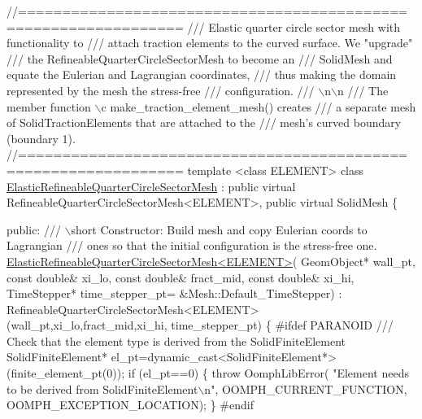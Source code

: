 \begin{DoxyCodeInclude}
\textcolor{comment}{//================================================================}\textcolor{comment}{}
\textcolor{comment}{/// Elastic quarter circle sector mesh with functionality to}
\textcolor{comment}{/// attach traction elements to the curved surface. We "upgrade"}
\textcolor{comment}{/// the RefineableQuarterCircleSectorMesh to become an}
\textcolor{comment}{/// SolidMesh and equate the Eulerian and Lagrangian coordinates,}
\textcolor{comment}{/// thus making the domain represented by the mesh the stress-free }
\textcolor{comment}{/// configuration. }
\textcolor{comment}{/// \(\backslash\)n\(\backslash\)n}
\textcolor{comment}{/// The member function \(\backslash\)c make\_traction\_element\_mesh() creates}
\textcolor{comment}{/// a separate mesh of SolidTractionElements that are attached to the}
\textcolor{comment}{/// mesh's curved boundary (boundary 1). }
\textcolor{comment}{}\textcolor{comment}{//================================================================}
\textcolor{keyword}{template} <\textcolor{keyword}{class} ELEMENT>
\textcolor{keyword}{class }\hyperlink{classElasticRefineableQuarterCircleSectorMesh}{ElasticRefineableQuarterCircleSectorMesh} :
 \textcolor{keyword}{public} \textcolor{keyword}{virtual} RefineableQuarterCircleSectorMesh<ELEMENT>,
 \textcolor{keyword}{public} \textcolor{keyword}{virtual} SolidMesh
\{


\textcolor{keyword}{public}:
\textcolor{comment}{}
\textcolor{comment}{ /// \(\backslash\)short Constructor: Build mesh and copy Eulerian coords to Lagrangian}
\textcolor{comment}{ /// ones so that the initial configuration is the stress-free one.}
\textcolor{comment}{} \hyperlink{classElasticRefineableQuarterCircleSectorMesh}{ElasticRefineableQuarterCircleSectorMesh<ELEMENT>}(
      GeomObject* wall\_pt,
                                         \textcolor{keyword}{const} \textcolor{keywordtype}{double}& xi\_lo,
                                         \textcolor{keyword}{const} \textcolor{keywordtype}{double}& fract\_mid,
                                         \textcolor{keyword}{const} \textcolor{keywordtype}{double}& xi\_hi,
                                         TimeStepper* time\_stepper\_pt=
                                         &Mesh::Default\_TimeStepper) :
  RefineableQuarterCircleSectorMesh<ELEMENT>(wall\_pt,xi\_lo,fract\_mid,xi\_hi,
                                             time\_stepper\_pt)
  \{
\textcolor{preprocessor}{#ifdef PARANOID}
\textcolor{comment}{   /// Check that the element type is derived from the SolidFiniteElement}
\textcolor{comment}{}   SolidFiniteElement* el\_pt=\textcolor{keyword}{dynamic\_cast<}SolidFiniteElement*\textcolor{keyword}{>}
    (finite\_element\_pt(0));
   \textcolor{keywordflow}{if} (el\_pt==0)
    \{
     \textcolor{keywordflow}{throw} OomphLibError(
      \textcolor{stringliteral}{"Element needs to be derived from SolidFiniteElement\(\backslash\)n"},
      OOMPH\_CURRENT\_FUNCTION,
      OOMPH\_EXCEPTION\_LOCATION);
    \}
\textcolor{preprocessor}{#endif}


\end{DoxyCodeInclude}
